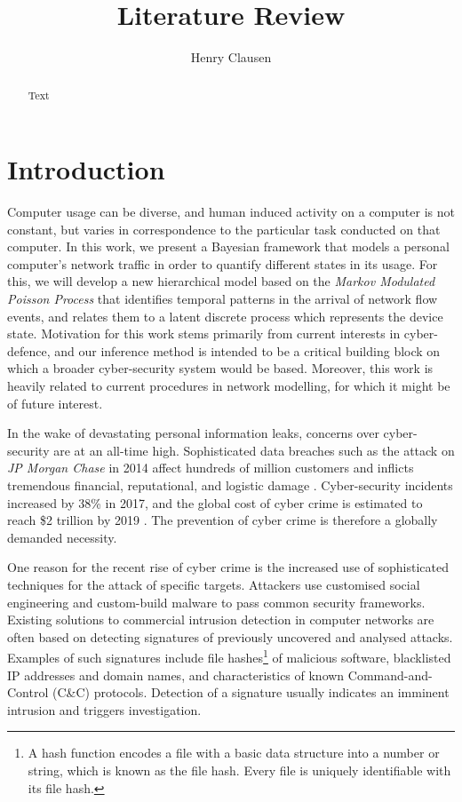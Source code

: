 \documentclass[a4paper,12pt,twoside]{report}
\begin{document}
\title{\LARGE {\bf Literature Review}\\
 \vspace*{6mm}
}

\author{Henry Clausen}

\maketitle

\begin{abstract}
Text
\end{abstract}


\chapter{Introduction}

Computer usage can be diverse, and human induced activity on a computer is not constant, but varies in correspondence to the particular task conducted on that computer. In this work, we present a Bayesian framework that models a personal computer's network traffic in order to quantify different states in its usage. For this, we will develop a new hierarchical model based on the \emph{Markov Modulated Poisson Process} that identifies temporal patterns in the arrival of network flow events, and relates them to a latent discrete process which represents the device state. Motivation for this work stems primarily from current interests in cyber-defence, and our inference method is intended to be a critical building block on which a broader cyber-security system would be based. Moreover, this work is heavily related to current procedures in network modelling, for which it might be of future interest.


In the wake of devastating personal information leaks, concerns over cyber-security are at an all-time high. 
Sophisticated data breaches such as the attack on \emph{JP Morgan Chase} in 2014  affect hundreds of million customers and inflicts tremendous financial, reputational, and logistic damage %
. Cyber-security incidents increased by 38\% in 2017, and the global cost of cyber crime is estimated to reach \$2 trillion by 2019 %
. The prevention of cyber crime is therefore a globally demanded necessity.

One reason for the recent rise of cyber crime is the increased use of sophisticated techniques for the attack of specific targets. Attackers use customised social engineering and custom-build malware to pass common security frameworks.
Existing solutions to commercial intrusion detection in computer networks are often based on detecting signatures of previously uncovered  and  analysed  attacks. Examples of such signatures include  file  hashes\footnote{A hash function encodes a file with a basic data structure into a number or string, which is known as the file hash. Every file is uniquely identifiable with its file hash.} of malicious software, blacklisted IP addresses and domain names, and characteristics of known Command-and-Control (C\&C) protocols. Detection of a signature usually indicates an imminent intrusion and triggers investigation.
\end{document}
